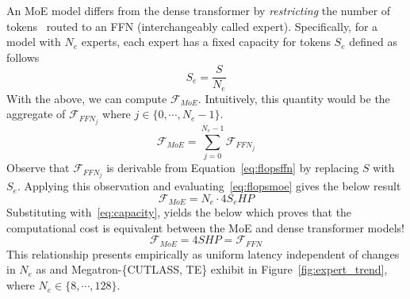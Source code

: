 An MoE model differs from the dense transformer by \emph{restricting} the number of
tokens~\cite{DBLP:conf/iclr/LepikhinLXCFHKS21, MLSYS2023_5a54f793} routed to an FFN
(interchangeably called expert).
Specifically, for a model with $N_e$ experts, each expert has a fixed capacity for tokens $S_e$ defined as follows
\begin{equation}\label{eq:capacity}
S_e = \frac{S}{N_e}
\end{equation}
With the above, we can compute $\mathcal{F}_{MoE}$.
Intuitively, this quantity would be the aggregate of $\mathcal{F}_{{FFN}_j}$ where $j \in \{0, \cdots, N_e - 1\}$.
\begin{equation}\label{eq:flopsmoe}
\mathcal{F}_{MoE} = \sum\limits_{j = 0}^{N_e - 1}\mathcal{F}_{{FFN}_j}
\end{equation}
Observe that $\mathcal{F}_{{FFN}_j}$ is derivable from Equation~\ref{eq:flopsffn}
by replacing $S$ with $S_e$.
Applying this observation and evaluating~\ref{eq:flopsmoe} gives the below result
\begin{equation}\label{eq:flopsmoe2}
\mathcal{F}_{MoE} = N_e \cdot 4S_{e}HP
\end{equation}
Substituting with~\ref{eq:capacity}, yields the below which proves that the computational cost is equivalent
between the MoE and dense transformer models!
\begin{equation}\label{eq:equivalence}
\mathcal{F}_{MoE} = 4SHP = \mathcal{F}_{FFN}
\end{equation}
This relationship presents empirically as uniform latency independent of changes in $N_e$
as \sysname and Megatron-\{CUTLASS, TE\} exhibit in Figure~\ref{fig:expert_trend},
where $N_e \in \{8, \cdots, 128\}$.
